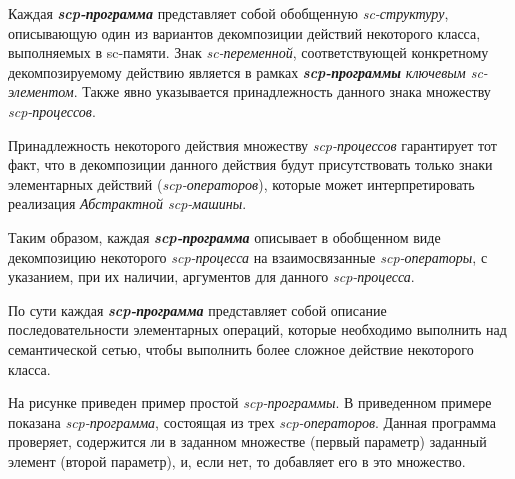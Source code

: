 \begin{SCn}
\end{SCn}

Каждая \textbf{\textit{scp-программа}} представляет собой обобщенную \textit{sc-структуру}, описывающую один из вариантов декомпозиции действий некоторого класса, выполняемых в sc-памяти. Знак \textit{sc-переменной}, соответствующей конкретному декомпозируемому действию является в рамках \textbf{\textit{scp-программы}} \textit{ключевым sc-элементом\scnrolesign}. Также явно указывается принадлежность данного знака множеству \textit{scp-процессов}.
	
Принадлежность некоторого действия множеству \textit{scp-процессов} гарантирует тот факт, что в декомпозиции данного действия будут присутствовать только знаки элементарных действий (\textit{scp-операторов}), которые может интерпретировать реализация \textit{Абстрактной scp-машины}.

Таким образом, каждая \textbf{\textit{scp-программа}} описывает в обобщенном виде декомпозицию некоторого \textit{\mbox{scp-процесса}} на взаимосвязанные \textit{scp-операторы}, с указанием, при их наличии, аргументов для данного \textit{scp-процесса}.

По сути каждая \textbf{\textit{scp-программа}} представляет собой описание последовательности элементарных операций, которые необходимо выполнить над семантической сетью, чтобы выполнить более сложное действие некоторого класса.

На рисунке \textit{} приведен пример простой \textit{scp-программы}. В приведенном примере показана \textit{scp-программа}, состоящая из трех \textit{scp-операторов}. Данная программа проверяет, содержится ли в заданном множестве (первый параметр) заданный элемент (второй параметр), и, если нет, то добавляет его в это множество.
	

